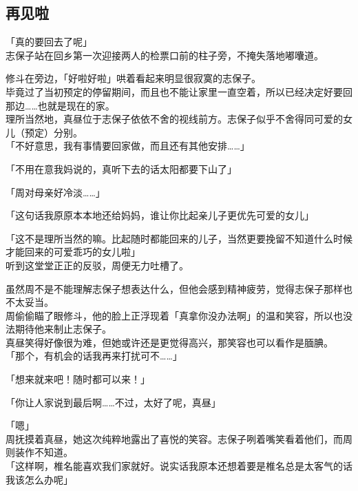 \subsection{再见啦}

「真的要回去了呢」\\

志保子站在回乡第一次迎接两人的检票口前的柱子旁，不掩失落地嘟囔道。

修斗在旁边，「好啦好啦」哄着看起来明显很寂寞的志保子。\\

毕竟过了当初预定的停留期间，而且也不能让家里一直空着，所以已经决定好要回那边……也就是现在的家。\\

理所当然地，真昼位于志保子依依不舍的视线前方。志保子似乎不舍得同可爱的女儿（预定）分别。\\

「不好意思，我有事情要回家做，而且还有其他安排……」

「不用在意我妈说的，真听下去的话太阳都要下山了」

「周对母亲好冷淡……」

「这句话我原原本本地还给妈妈，谁让你比起亲儿子更优先可爱的女儿」

「这不是理所当然的嘛。比起随时都能回来的儿子，当然更要挽留不知道什么时候才能回来的可爱乖巧的女儿啦」\\

听到这堂堂正正的反驳，周便无力吐槽了。

虽然周不是不能理解志保子想表达什么，但他会感到精神疲劳，觉得志保子那样也不太妥当。\\

周偷偷瞄了眼修斗，他的脸上正浮现着「真拿你没办法啊」的温和笑容，所以也没法期待他来制止志保子。\\

真昼笑得好像很为难，但她或许还是更觉得高兴，那笑容也可以看作是腼腆。\\

「那个，有机会的话我再来打扰可不……」

「想来就来吧！随时都可以来！」

「你让人家说到最后啊……不过，太好了呢，真昼」

「嗯」\\

周抚摸着真昼，她这次纯粹地露出了喜悦的笑容。志保子咧着嘴笑看着他们，而周则装作不知道。\\

「这样啊，椎名能喜欢我们家就好。说实话我原本还想着要是椎名总是太客气的话我该怎么办呢」


